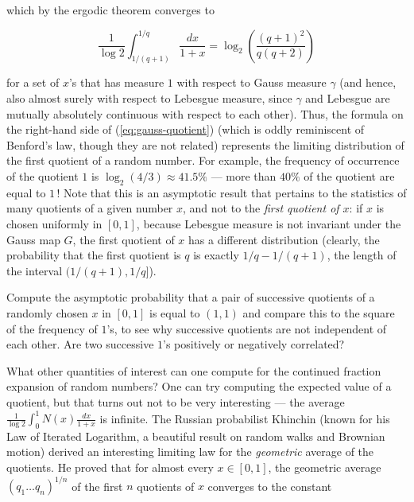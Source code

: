 \begin{enumerate}[label=\arabic*.]
\noindent which by the ergodic theorem converges to

\begin{equation*} \tag{21}\label{eq:gauss-quotient}
\frac{1}{\log 2}\int_{1/(q+1)}^{1/q} \frac{dx}{1+x} = \log_2 \left( \frac{(q+1)^2}{q(q+2)}\right)
\end{equation*}

\noindent for a set of $x$'s that has measure $1$ with respect
to Gauss measure $\gamma$ (and hence, also almost
surely with respect to Lebesgue measure, since
$\gamma$ and Lebesgue are mutually absolutely
continuous with respect to each other). Thus, the
formula on the right-hand side of
(\ref{eq:gauss-quotient}) (which is oddly reminiscent of
Benford's law, though they are not related) represents
the limiting distribution of the first quotient of a
random number. For example, the frequency of
occurrence of the quotient $1$ is
$\log_2(4/3) \approx 41.5\%$ --- more than $40\%$ of
the quotient are equal to $1$\,! Note that this is an
asymptotic result that pertains to the statistics of
many quotients of a given number $x$, and not to the
\emph{first quotient of $x$}: if $x$ is chosen uniformly
in $[0,1]$, because Lebesgue measure is not invariant
under the Gauss map $G$, the first quotient of $x$
has a different distribution (clearly, the probability
that the first quotient is $q$ is exactly
$1/q-1/(q+1)$, the length of the interval
$(1/(q+1),1/q]$).

\begin{xexercise}
Compute the asymptotic probability that a pair of
successive quotients of a randomly chosen $x$ in
$[0,1]$ is equal to $(1,1)$ and compare this to the
square of the frequency of $1$'s, to see why
successive quotients are not independent of each
other. Are two successive $1$'s positively or
negatively correlated?
\end{xexercise}

\noindent What other quantities of interest can one compute for
the continued fraction expansion of random numbers?
One can try computing the expected value of a
quotient, but that turns out not to be very
interesting --- the average
$\frac{1}{\log 2} \int_0^1 N(x) \frac{dx}{1+x}$ is
infinite. The Russian probabilist Khinchin (known for
his Law of Iterated Logarithm, a beautiful result on
random walks and Brownian motion) derived an
interesting limiting law for the \emph{geometric} average
of the quotients. He proved that for almost every
$x\in[0,1]$, the geometric average
$(q_1\ldots q_n)^{1/n}$ of the first $n$ quotients of
$x$ converges to the constant


\end{enumerate}
